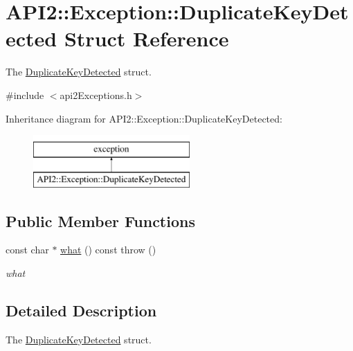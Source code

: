 \hypertarget{struct_a_p_i2_1_1_exception_1_1_duplicate_key_detected}{\section{A\-P\-I2\-:\-:Exception\-:\-:Duplicate\-Key\-Detected Struct Reference}
\label{struct_a_p_i2_1_1_exception_1_1_duplicate_key_detected}
}


The \hyperlink{struct_a_p_i2_1_1_exception_1_1_duplicate_key_detected}{Duplicate\-Key\-Detected} struct.  




{\ttfamily \#include $<$api2\-Exceptions.\-h$>$}

Inheritance diagram for A\-P\-I2\-:\-:Exception\-:\-:Duplicate\-Key\-Detected\-:\begin{figure}[H]
\begin{center}
\leavevmode
\includegraphics[height=2.000000cm]{struct_a_p_i2_1_1_exception_1_1_duplicate_key_detected}
\end{center}
\end{figure}
\subsection*{Public Member Functions}
\begin{DoxyCompactItemize}
\item 
const char $\ast$ \hyperlink{struct_a_p_i2_1_1_exception_1_1_duplicate_key_detected_afda937f16a024e497e3ac6d8240c7123}{what} () const   throw ()
\begin{DoxyCompactList}\small\item\em what \end{DoxyCompactList}\end{DoxyCompactItemize}


\subsection{Detailed Description}
The \hyperlink{struct_a_p_i2_1_1_exception_1_1_duplicate_key_detected}{Duplicate\-Key\-Detected} struct. 

